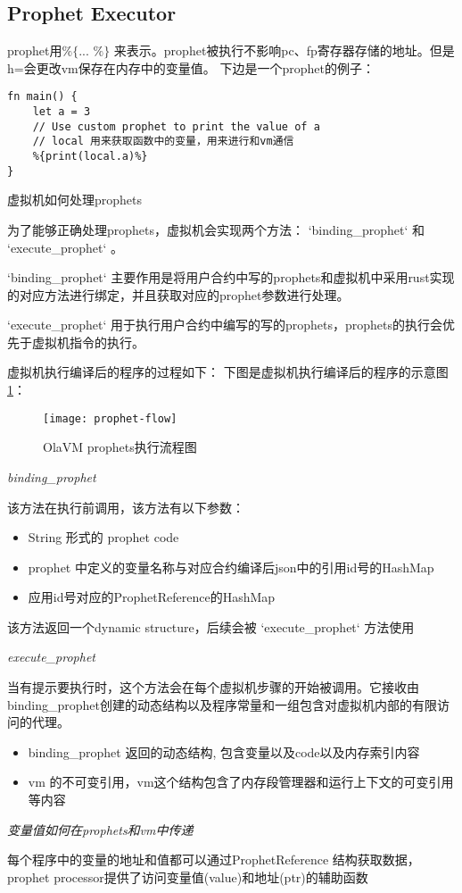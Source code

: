 \subsection{Prophet Executor}\label{subsec: processor-prophet-executor}
prophet用$\texttt{\%\{ ... \%\}}$ 来表示。prophet被执行不影响pc、fp寄存器存储的地址。但是h=会更改vm保存在内存中的变量值。
下边是一个prophet的例子：
\begin{lstlisting}[label={lst:prophet-demo}]
fn main() {
    let a = 3
    // Use custom prophet to print the value of a
    // local 用来获取函数中的变量，用来进行和vm通信
    %{print(local.a)%}
}
\end{lstlisting}

虚拟机如何处理prophets

为了能够正确处理prophets，虚拟机会实现两个方法： `binding\_prophet` 和 `execute\_prophet` 。

`binding\_prophet` 主要作用是将用户合约中写的prophets和虚拟机中采用rust实现的对应方法进行绑定，并且获取对应的prophet参数进行处理。

`execute\_prophet` 用于执行用户合约中编写的写的prophets，prophets的执行会优先于虚拟机指令的执行。

虚拟机执行编译后的程序的过程如下：
下图是虚拟机执行编译后的程序的示意图\ref{fig: prophet-flow}：
\begin{figure}[!htp]
    \centering
    \texttt{[image: prophet-flow]}
    \caption{OlaVM prophets执行流程图}
    \label{fig: prophet-flow}
\end{figure}

\emph{binding\_prophet}

该方法在执行前调用，该方法有以下参数：

\begin{itemize}
    \item String 形式的  prophet code
    \item prophet 中定义的变量名称与对应合约编译后json中的引用id号的HashMap
    \item 应用id号对应的ProphetReference的HashMap
\end{itemize}

该方法返回一个dynamic structure，后续会被 `execute\_prophet` 方法使用

\emph{execute\_prophet}

当有提示要执行时，这个方法会在每个虚拟机步骤的开始被调用。它接收由binding\_prophet创建的动态结构以及程序常量和一组包含对虚拟机内部的有限访问的代理。

\begin{itemize}
    \item binding\_prophet 返回的动态结构, 包含变量以及code以及内存索引内容
    \item vm 的不可变引用，vm这个结构包含了内存段管理器和运行上下文的可变引用等内容
\end{itemize}

\emph{变量值如何在prophets和vm中传递}

每个程序中的变量的地址和值都可以通过ProphetReference 结构获取数据，prophet processor提供了访问变量值(value)和地址(ptr)的辅助函数